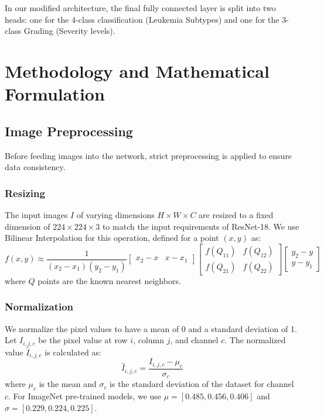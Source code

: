 \documentclass[journal]{IEEEtran}
\begin{document}
In our modified architecture, the final fully connected layer is split into two heads: one for the 4-class classification (Leukemia Subtypes) and one for the 3-class Grading (Severity levels).

\section{Methodology and Mathematical Formulation}

\subsection{Image Preprocessing}
Before feeding images into the network, strict preprocessing is applied to ensure data consistency.
\subsubsection{Resizing} 
The input images $I$ of varying dimensions $H \times W \times C$ are resized to a fixed dimension of $224 \times 224 \times 3$ to match the input requirements of ResNet-18. We use Bilinear Interpolation for this operation, defined for a point $(x, y)$ as:
\begin{equation}
f(x, y) \approx \frac{1}{(x_2-x_1)(y_2-y_1)} \begin{bmatrix} x_2-x & x-x_1 \end{bmatrix} \begin{bmatrix} f(Q_{11}) & f(Q_{12}) \\ f(Q_{21}) & f(Q_{22}) \end{bmatrix} \begin{bmatrix} y_2-y \\ y-y_1 \end{bmatrix}
\end{equation}
where $Q$ points are the known nearest neighbors.

\subsubsection{Normalization}
We normalize the pixel values to have a mean of 0 and a standard deviation of 1. Let $I_{i,j,c}$ be the pixel value at row $i$, column $j$, and channel $c$. The normalized value $\hat{I}_{i,j,c}$ is calculated as:
\begin{equation}
\hat{I}_{i,j,c} = \frac{I_{i,j,c} - \mu_c}{\sigma_c}
\end{equation}
where $\mu_c$ is the mean and $\sigma_c$ is the standard deviation of the dataset for channel $c$. For ImageNet pre-trained models, we use $\mu = [0.485, 0.456, 0.406]$ and $\sigma = [0.229, 0.224, 0.225]$.
\end{document}

